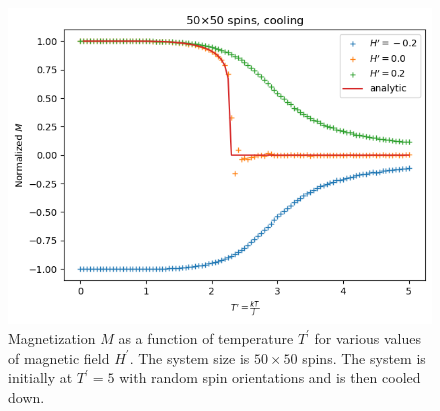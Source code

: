 \documentclass[11pt]{article}
\begin{document}
\begin{figure}[H]
    \centering
    \includegraphics[scale = 0.7]{Figs_TW/cool_magnetization_N50.png}
    \caption{Magnetization $M$ as a function of temperature $T^\prime$ for various values of magnetic field $H^\prime$. The system size is $50 \times 50$ spins. The system is initially at $T^\prime = 5$ with random spin orientations and is then cooled down.}
    \label{fig:cool_magnetization}
\end{figure}



\end{document}
